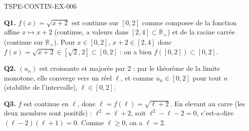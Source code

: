 \begin{corrige}{TSPE-CONTIN-EX-006}

\textbf{Q1.} $f(x) = \sqrt{x+2}$ est continue sur $[0,2]$ comme composee de la fonction affine $x \mapsto x+2$ (continue, a valeurs dans $[2,4] \subset \mathbb{R}_+$) et de la racine carrée (continue sur $\mathbb{R}_+$). Pour $x \in [0,2]$, $x+2 \in [2,4]$ donc $f(x) = \sqrt{x+2} \in [\sqrt{2}, 2] \subset [0,2]$ : on a bien $f([0,2]) \subset [0,2]$.

\textbf{Q2.} $(u_n)$ est croissante et majorée par $2$ : par le théorème de la limite monotone, elle converge vers un réel $\ell$, et comme $u_n \in [0,2]$ pour tout $n$ (stabilite de l'intervalle), $\ell \in [0,2]$.

\textbf{Q3.} $f$ est continue en $\ell$, donc $\ell = f(\ell) = \sqrt{\ell+2}$. En elevant au carre (les deux membres sont positifs) : $\ell^2 = \ell + 2$, soit $\ell^2 - \ell - 2 = 0$, c'est-a-dire $(\ell-2)(\ell+1) = 0$. Comme $\ell \geq 0$, on a $\boxed{\ell = 2}$.

\end{corrige}
